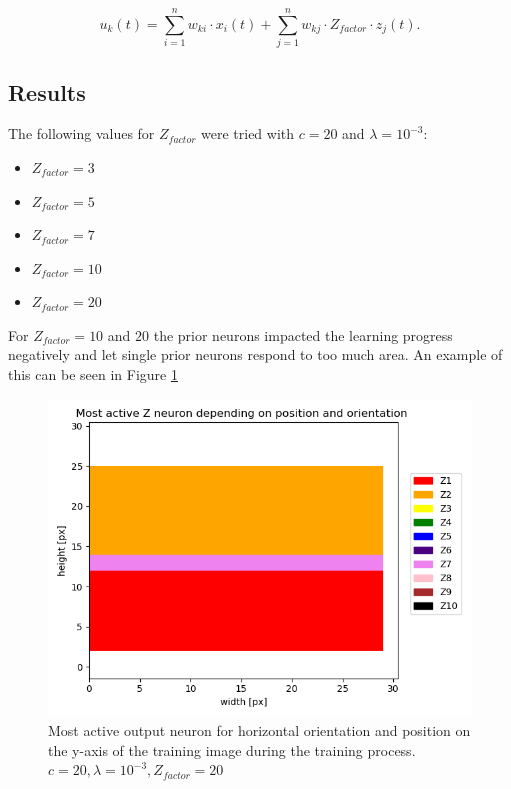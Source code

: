 \begin{equation}
\label{eqn:ukHorvert}
u_k(t) = \sum_{i=1}^n w_{ki} \cdot x_i(t) + \sum_{j=1}^n w_{kj} \cdot Z_{factor} \cdot z_j(t).
\end{equation}


\subsection{Results} 

The following values for $Z_{factor} $ were tried with $c = 20$ and $\lambda = 10^{-3}$:
\begin{itemize}
  \item $Z_{factor} = 3$
  \item $Z_{factor} = 5$
  \item $Z_{factor} = 7$  
  \item $Z_{factor} = 10$ 
  \item $Z_{factor} = 20$
\end{itemize}

For $Z_{factor} = 10$ and $20$ the prior neurons impacted the learning progress negatively and let single prior neurons respond to too much area. An example of this can be seen in Figure \ref{fig:horvert_c20_3_Zfactor20_horizontalLines}

\begin{figure}
  \includegraphics[width=\linewidth]{figures/horvert/horvert_c20_3_Zfactor20_horizontalLines.png}
  \caption{Most active output neuron for horizontal orientation and position on the y-axis of the training image during the training process. $c = 20, \lambda = 10^{-3}, Z_{factor} = 20$}
  \label{fig:horvert_c20_3_Zfactor20_horizontalLines}
\end{figure}


